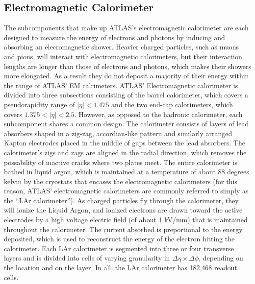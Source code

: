 \subsection{Electromagnetic Calorimeter}
The subcomponents that make up ATLAS's electromagnetic calorimeter are each designed to measure the energy of electrons and photons by inducing and absorbing an elecromagnetic shower.
Heavier charged particles, such as muons and pions, will interact with electromagnetic calorimeters, but their interaction lengths are longer than those of electrons and photons, which makes their showers more elongated.
As a result they do not deposit a majority of their energy within the range of ATLAS' EM calrimeters.
ATLAS' Electromagnetic calorimeter is divided into three subsections consisting of the barrel calorimeter, which covers a pseudorapidity range of $|\eta| < 1.475$ and the two end-cap calorimeters, which covers $1.375 < |\eta| < 2.5$.
However, as opposed to the hadronic calorimeter, each subcomponent shares a common design.
The calorimeter consists of layers of lead absorbers shaped in a zig-zag, accordian-like pattern and similarly arranged Kapton electrodes placed in the middle of gaps between the lead absorbers.
The calorimeter's zigs and zags are aligned in the radial direction, which removes the possability of inactive cracks where two plates meet.
The entire calorimeter is bathed in liquid argon, which is maintained at a temperature of about 88 degrees kelvin by the cryostats that encases the electromagnetic calorimeters (for this reason, ATLAS' electromagnetic calorimeters are commonly referred to simply as the ``LAr calorimeter'').
As charged particles fly through the calorimeter, they will ionize the Liquid Argon, and ionized electrons are drawn toward the active electrodes by a high voltage electric field (of about 1 kV/mm) that is maintained throughout the calorimeter. %
The current absorbed is preportional to the energy deposited, which is used to reconstruct the energy of the electron hitting the calorimeter.
Each LAr calorimeter is segmented into three or four transverse layers and is divided into cells of varying granularity in  $\Delta \eta \times \Delta \phi$, depending on the location and on the layer.%
In all, the LAr calorimeter has 182,468 readout cells.
